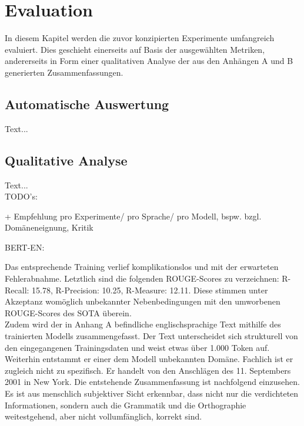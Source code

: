 \chapter{Evaluation}
\thispagestyle{fancy}
\label{chap:Evaluation}

\noindent
In diesem Kapitel werden die zuvor konzipierten Experimente umfangreich evaluiert. Dies geschieht einerseits auf Basis der ausgewählten Metriken, andererseits in Form einer qualitativen Analyse der aus den Anhängen A und B generierten Zusammenfassungen.


\section{Automatische Auswertung}
\noindent
Text...\\


\section{Qualitative Analyse}
\noindent
Text...\\


TODO's:

+ Empfehlung pro Experimente/ pro Sprache/ pro Modell, bspw. bzgl. Domäneneignung, Kritik

BERT-EN:

Das entsprechende Training verlief komplikationslos und mit der erwarteten Fehlerabnahme. Letztlich sind die folgenden \ac{ROUGE}-Scores zu verzeichnen: R-Recall: 15.78, R-Precision: 10.25, R-Measure: 12.11. Diese stimmen unter Akzeptanz womöglich unbekannter Nebenbedingungen mit den umworbenen \ac{ROUGE}-Scores des \ac{SOTA} überein.\\

\noindent
Zudem wird der in Anhang A befindliche englischsprachige Text mithilfe des trainierten Modells zusammengefasst. Der Text unterscheidet sich strukturell von den eingegangenen Trainingsdaten und weist etwas über 1.000 Token auf. Weiterhin entstammt er einer dem Modell unbekannten Domäne. Fachlich ist er zugleich nicht zu spezifisch. Er handelt von den Anschlägen des 11. Septembers 2001 in New York. Die entstehende Zusammenfassung ist nachfolgend einzusehen. Es ist aus menschlich subjektiver Sicht erkennbar, dass nicht nur die verdichteten Informationen, sondern auch die Grammatik und die Orthographie weitestgehend, aber nicht vollumfänglich, korrekt sind.\\

\noindent{}\\


